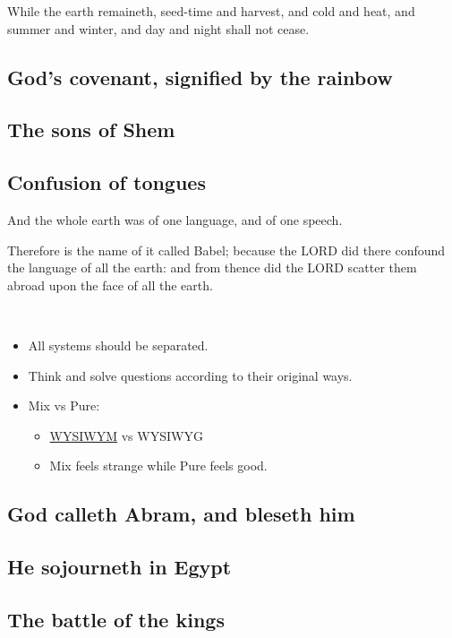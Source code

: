\documentclass{article}
\begin{document}
While the earth remaineth, seed-time and harvest, and cold and heat, and summer and winter, and day and night shall not cease.

\subsection{God's covenant, signified by the rainbow}
\subsection{The sons of Shem}
\subsection{Confusion of tongues}
And the whole earth was of one language, and of one speech.

Therefore is the name of it called Babel; because the LORD did there confound the language of all the earth: and from thence did the LORD scatter them abroad upon the face of all the earth.

\begin{remark}~
    \begin{itemize}
        \item All systems should be separated.
        \item Think and solve questions according to their original ways.
        \item Mix vs Pure:
              \begin{itemize}
                  \item \href{https://en.wikipedia.org/wiki/WYSIWYM}{WYSIWYM} vs WYSIWYG
                  \item Mix feels strange while Pure feels good.
              \end{itemize}
    \end{itemize}
\end{remark}

\subsection{God calleth Abram, and bleseth him}
\subsection{He sojourneth in Egypt}
\subsection{The battle of the kings}

\printbibliography
\end{document}
